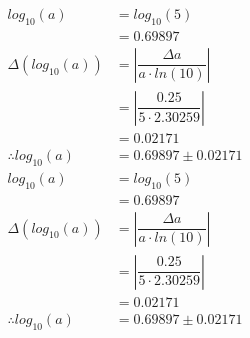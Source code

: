 \documentclass[a4paper]{article}
\begin{document}
\begin{align*}
log_{ 10 }\left( a \right) &= log_{ 10 }\left( 5 \right) \\
&= 0.69897 \\[4mm]
\Delta \left( log_{ 10 }\left( a \right) \right) &= \left| \dfrac{ \Delta a }{ a \cdot ln \left( 10 \right) } \right| \\
&= \left| \dfrac{ 0.25 }{ 5 \cdot 2.30259 } \right| \\
&= 0.02171\\[4mm]
\therefore log_{ 10 }\left( a \right) &= 0.69897 \pm 0.02171
\end{align*}
\begin{align*}
log_{ 10 }\left( a \right) &= log_{ 10 }\left( 5 \right) \\
&= 0.69897 \\[4mm]
\Delta \left( log_{ 10 }\left( a \right) \right) &= \left| \dfrac{ \Delta a }{ a \cdot ln \left( 10 \right) } \right| \\
&= \left| \dfrac{ 0.25 }{ 5 \cdot 2.30259 } \right| \\
&= 0.02171\\[4mm]
\therefore log_{ 10 }\left( a \right) &= 0.69897 \pm 0.02171
\end{align*}
\end{document}
